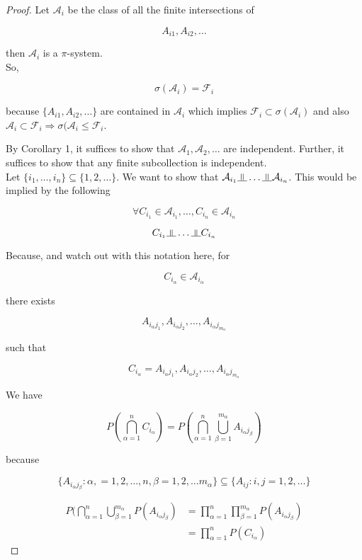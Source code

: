 \documentclass[11pt,fleqn]{book} %
\newcommand{\indep}{\rotatebox[origin=c]{90}{$\models$}}
\begin{document}
\begin{proof}
	Let $\mathcal{A}_i$ be the class of all the finite intersections of 

	$$A_{i1}, A_{i2}, \dots$$

	then $\mathcal{A}_i$ is a $\pi$-system. \\

	So, 

	$$\sigma(\mathcal{A}_i) = \mathcal{F}_i $$

	because $\{A_{i1}, A_{i2}, \dots \}$ are contained in $\mathcal{A}_i$ which implies $\mathcal{F}_i \subset \sigma(\mathcal{A}_i)$ and also $\mathcal{A}_i \subset \mathcal{F}_i \Rightarrow \sigma(\mathcal{A}_i \leq \mathcal{F}_i$.

	By Corollary 1, it suffices to show that $\mathcal{A}_1, \mathcal{A}_2, \dots$ are independent. Further, it suffices to show that any finite subcollection is independent.\\

	Let $\{i_1, \dots, i_n \} \subseteq \{1, 2, \dots \}$. We want to show that $\mathcal{A}_{i_1}\indep \dots \indep \mathcal{A}_{i_n}$. This would be implied by the following

	$$\forall C_{i_1} \in \mathcal{A}_{i_1}, \dots, C_{i_n} \in \mathcal{A}_{i_n} $$

	$$C_{i_1} \indep \dots \indep C_{i_n}$$

	Because, and watch out with this notation here, for

			$$C_{i_\alpha} \in \mathcal{A}_{i_\alpha} $$

		there exists

		$${A}_{i_\alpha j_1}, {A}_{i_\alpha j_2}, \dots, {A}_{i_\alpha j_{m_\alpha}} $$

		such that

		$$C_{i_\alpha} = {A}_{i_\alpha j_1}, {A}_{i_\alpha j_2}, \dots, {A}_{i_\alpha j_{m_\alpha}} $$

		We have

		$$ P(\bigcap^n_{\alpha = 1} C_{i_\alpha}) = P(\bigcap^n_{\alpha = 1} \bigcup^{m_\alpha}_{\beta = 1} A_{i_\alpha j_\beta})$$

		because 

		$$\{A_{i_\alpha j_\beta}: \alpha, = 1, 2, \dots, n , \beta = 1, 2, \dots m_\alpha\} \subseteq \{ A_{ij}: i, j = 1, 2, \dots\}$$

		\begin{align*}
			P(\bigcap^n_{\alpha = 1} \bigcup^{m_\alpha}_{\beta = 1} P(A_{i_\alpha j_\beta}) &= \displaystyle \prod^n_{\alpha = 1} \prod^{m_\alpha}_{\beta = 1} P(A_{i_\alpha j_\beta})\\
			&= \displaystyle \prod^n_{\alpha = 1} P(C_{i_\alpha})
		\end{align*}
\end{proof}
\end{document}
